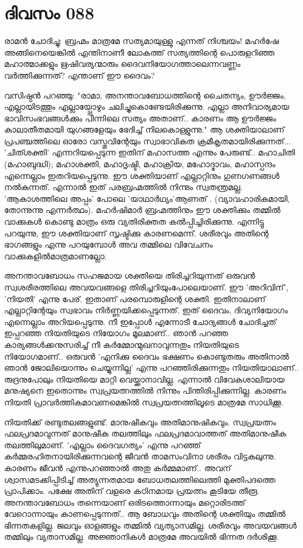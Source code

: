  
\section{ദിവസം 088}


രാമന്‍ ചോദിച്ചു: ബ്രഹ്മം മാത്രമേ സത്യമായുള്ളു എന്നത്‌ നിശ്ചയം! മഹര്‍ഷേ അങ്ങിനെയെങ്കില്‍ എന്തിനാണീ ലോകത്ത്‌ സത്യത്തിന്റെ പൊരുളറിഞ്ഞ മഹാത്മാക്കളും ഋഷിവര്യന്മാരും ദൈവനിയോഗത്താലെന്നവണ്ണം വര്‍ത്തിക്കുന്നത്‌? എന്താണ്‌ ഈ ദൈവം?

വസിഷ്ഠന്‍ പറഞ്ഞു: "രാമാ, അനന്താവബോധത്തിന്റെ ചൈതന്യം, ഊര്‍ജ്ജം, എല്ലായിടത്തും എല്ലായ്പ്പോഴും ചലിച്ചുകൊണ്ടേയിരിക്കുന്നു. എല്ലാ അനിവാര്യമായ ഭാവിസംഭവങ്ങള്‍ക്കും പിന്നിലെ സത്യം അതാണ്‌.. കാരണം ആ ഊര്‍ജ്ജം കാലാതീതമായി യുഗങ്ങളേയും ഭേദിച്ച്‌ നിലകൊള്ളുന്നു." ആ ശക്തിയാലാണ്‌ പ്രപഞ്ചത്തിലെ ഓരോ വസ്തുവിന്റേയും സ്വാഭാവികത ക്രമീകൃതമായിരിക്കുന്നത്‌... 'ചിത്ശക്തി' എന്നറിയപ്പെടുന്ന ഇതിന്‌ മഹാസത്ത എന്നും പേരുണ്ട്‌.. മഹാചിതി (മഹാബുദ്ധി); മഹാശക്തി, മഹാദൃഷ്ടി, മഹാക്രിയ, മഹോദ്ഭാവം, മഹാസ്പന്ദം എന്നെല്ലാം ഇതറിയപ്പെടുന്നു. ഈ ശക്തിയാണ്‌ എല്ലാറ്റിനും ഗുണഗണങ്ങള്‍ നല്‍കുന്നത്‌. എന്നാല്‍ ഇത്‌ പരബ്രഹ്മത്തില്‍ നിന്നും സ്വതന്ത്രമല്ല. 'ആകാശത്തിലെ അപ്പം' പോലെ 'യാഥാര്‍ഥ്യം'ആണത്‌ . (വ്യാവഹാരികമായി, തോന്നുന്നു എന്നര്‍ത്ഥം). മഹര്‍ഷിമാര്‍ ബ്രഹ്മത്തിനും ഈ ശക്തിക്കും തമ്മില്‍ വാക്കുകള്‍ കൊണ്ടു മാത്രം ഒരു വ്യതിരിക്തത കല്‍പ്പിച്ചിരിക്കുന്നു. എന്നിട്ടു പറയുന്നു, ഈ ശക്തിയാണ്‌ സൃഷ്ടിക്കു കാരണമെന്ന്. ശരീരവും അതിന്റെ ഭാഗങ്ങളും എന്നു പറയുമ്പോള്‍ അവ തമ്മിലെ വിവേചനം വാക്കുകളില്‍മാത്രമാണല്ലോ. 

അനന്താവബോധം സഹജമായ ശക്തിയെ തിരിച്ചറിയുന്നത്‌ ഒരുവന്‍ സ്വശരീരത്തിലെ അവയവങ്ങളെ തിരിച്ചറിയുംപോലെയാണ്‌. ഈ 'അറിവിന്‌', 'നിയതി' എന്നു പേര്‌. ഇതാണ്‌ പരമ്പൊരുളിന്റെ ശക്തി. ഇതിനാലാണ്‌ എല്ലാറ്റിന്റേയും സ്വഭാവം നിര്‍ണ്ണയിക്കപ്പെടുന്നത്‌. ഇത്‌ ദൈവം, ദിവ്യനിയോഗം എന്നെല്ലാം അറിയപ്പെടുന്നു. നീ ഇപ്പോള്‍ എന്നോടീ ചോദ്യങ്ങള്‍ ചോദിച്ചത്‌ ഇപ്പറഞ്ഞ നിയതിയുടെ നിയോഗം മൂലമാണ്‌.. ഞാന്‍ പറഞ്ഞ കാര്യങ്ങള്‍ക്കനുസരിച്ച്‌ നീ കര്‍മ്മോന്മുഖനാവുന്നതും നിയതിയുടെ നിയോഗമാണ്‌.. ഒരുവന്‍ 'എനിക്കു ദൈവം ഭക്ഷണം കൊണ്ടുതരും അതിനാല്‍ ഞാന്‍ ജോലിയൊന്നും ചെയ്യുന്നില്ല' എന്നു പറഞ്ഞിരിക്കുന്നതും നിയതിയാലാണ്‌.. രുദ്രനുപോലും നിയതിയെ മാറ്റി വെയ്ക്കാനാവില്ല. എന്നാല്‍ വിവേകശാലിയായ മനുഷ്യനെ ഇതൊന്നും സ്വപ്രയത്നത്തില്‍ നിന്നും പിന്തിരിപ്പിക്കുന്നില്ല. കാരണം നിയതി പ്രാവര്‍ത്തികമാവണമെങ്കില്‍ സ്വപ്രയത്നത്തിലൂടെ മാത്രമേ സാധിക്കൂ. 

നിയതിക്ക്‌ രണ്ടുതലങ്ങളുണ്ട്‌. മാനുഷീകവും അതിമാനുഷികവും. സ്വപ്രയത്നം ഫലപ്രദമാവുന്നത്‌ മാനുഷീക തലത്തിലും ഫലപ്രദമാവാത്തത്‌ അതിമാനുഷീക തലത്തിലുമാണ്. 'എല്ലാം ദൈവഗത്യം' എന്നു പറഞ്ഞ്‌ കര്‍മ്മരഹിതനായിരിക്കുന്നവന്റെ ജീവന്‍ താമസംവിനാ ശരീരം വിട്ടകലുന്നു. കാരണം ജീവന്‍ എന്നുപറഞ്ഞാല്‍ അതു കര്‍മ്മമാണ്‌.. അവന്‌ ശ്വാസമടക്കിപ്പിടിച്ച്‌ അത്യുന്നതമായ ബോധതലത്തിലെത്തി മുക്തിപദത്തെ പ്രാപിക്കാം. പക്ഷേ അതിന്‌ വളരെ കഠിനമായ പ്രയത്നം കൂടിയേ തീരൂ. അനന്താവബോധം തന്നെയാണ്‌ ഒരിടത്തൊന്നായും മറ്റൊരിടത്ത്‌ വേറൊന്നായും കാണപ്പെടുന്നത്‌.. ആ ബോധവും അതിന്റെ ശക്തിയും തമ്മില്‍ ഭിന്നതകളില്ല. ജലവും ഓളങ്ങളും തമ്മില്‍ വ്യത്യാസമില്ല. ശരീരവും അവയവങ്ങള്‍ തമ്മിലും വ്യതാസമില്ല. അജ്ഞാനികള്‍ മാത്രമേ അവയില്‍ ഭിന്നത ദര്‍ശിക്കൂ. 


